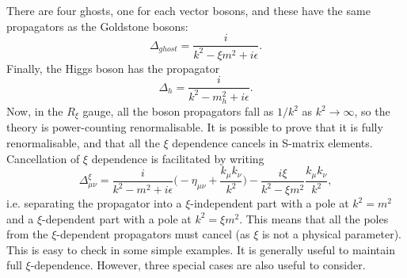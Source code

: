 There are four ghosts, one for each vector bosons, and these have the same propagators as the Goldstone bosons:
\begin{equation}
\Delta_{ghost} = \frac{i}{k^2 - \xi m^2 + i\epsilon}.
\end{equation}
Finally, the Higgs boson has the propagator
\begin{equation}
\Delta_{h} = \frac{i}{k^2 -  m_h^2 + i\epsilon}.
\end{equation} 
Now, in the $R_\xi$ gauge, all the boson propagators fall as $1/k^2$ as $k^2 \to \infty$, so the theory is power-counting renormalisable. It is possible to prove that it is fully renormalisable, and that all the $\xi$ dependence cancels in S-matrix elements. Cancellation of $\xi$ dependence is facilitated by writing
\begin{equation}
\Delta_{\mu \nu}^\xi = \frac{i}{k^2 - m^2 + i\epsilon}\bigg(-\eta_{\mu \nu} + \frac{k_\mu k_\nu}{k^2} \bigg) - \frac{i\xi}{k^2 - \xi m^2}\frac{k_\mu k_\nu}{k^2},
\end{equation}
i.e. separating the propagator into a $\xi$-independent part with a pole at $k^2 = m^2$ and a $\xi$-dependent part with a pole at $k^2 = \xi m^2$. This means that all the poles from the $\xi$-dependent propagators must cancel (as $\xi$ is not a physical parameter). This is easy to check in some simple examples. It is generally useful to maintain full $\xi$-dependence. However, three special cases are also useful to consider.
